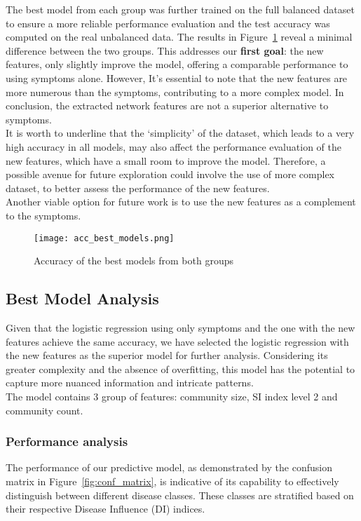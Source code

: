 \noindent
The best model from each group was further trained on the full balanced dataset to ensure a more reliable
performance evaluation and the test accuracy was computed on the real unbalanced data.
The results in Figure~\ref{fig:acc_best_models} reveal a minimal difference between
the two groups. This addresses our \textbf{first goal}: the new features, only slightly improve the model,
offering a comparable performance to using symptoms alone. However, It's essential to note that the new features are
more numerous than the symptoms, contributing to a more complex model. In conclusion, the extracted network
features are not a superior alternative to symptoms.\\
It is worth to underline that the `simplicity' of the dataset, which leads to a very high accuracy in all models, may also affect the performance
evaluation of the new features, which have a small room to improve the model. Therefore, a possible avenue
for future exploration could involve the use of more complex dataset, to better assess the performance of the
new features.\\
Another viable option for future work is to use the new features as a complement to the symptoms.




\begin{figure}[H]
	\centering
	\texttt{[image: acc\_best\_models.png]}
	\caption{Accuracy of the best models from both groups}\label{fig:acc_best_models}
\end{figure}




\subsection{Best Model Analysis}
Given that the logistic regression using only symptoms and the one with the new features achieve the same accuracy,
we have selected the logistic regression with the new features as the superior model for further analysis.
Considering its greater complexity and the absence of overfitting,
this model has the potential to capture more nuanced information and intricate patterns.\\
The model contains 3 group of features: community size, SI index level 2 and community count.
\subsubsection*{Performance analysis}
The performance of our predictive model, as demonstrated by the confusion matrix in Figure~\ref{fig:conf_matrix},
is indicative of its capability to effectively distinguish between different disease classes.
These classes are stratified based on their respective Disease Influence (DI) indices.

